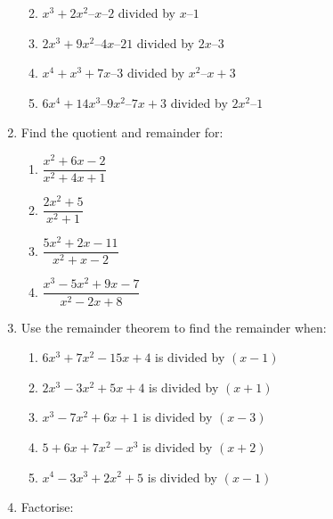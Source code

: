 \documentclass[
  12pt,
  oneside]{book}
\providecommand{\tightlist}{%
  \setlength{\itemsep}{0pt}\setlength{\parskip}{0pt}}
\theoremstyle{definition}
\theoremstyle{definition}
\theoremstyle{definition}
\theoremstyle{definition}
\theoremstyle{remark}
\begin{document}
\begin{enumerate}
  \begin{enumerate}
  \def\labelenumii{\alph{enumii})}
  \tightlist
  \item
    \(x^3 + 2x^2 – x – 2\) divided by \(x – 1\)
  \item
    \(2x^3 + 9x^2 – 4x – 21\) divided by \(2x – 3\)
  \item
    \(x^4 + x^3 + 7x – 3\) divided by \(x^2 – x + 3\)
  \item
    \(6x^4 + 14x^3 – 9x^2 – 7x + 3\) divided by \(2x^2 – 1\)
  \end{enumerate}
\item
  Find the quotient and remainder for:

  \begin{enumerate}
  \def\labelenumii{\alph{enumii})}
  \tightlist
  \item
    \(\dfrac{x^2+6x-2}{x^2+4x+1}\)
  \item
    \(\dfrac{2x^2+5}{x^2+1}\)
  \item
    \(\dfrac{5x^2+2x-11}{x^2+x-2}\)
  \item
    \(\dfrac{x^3-5x^2+9x-7}{x^2-2x+8}\)
  \end{enumerate}
\item
  Use the remainder theorem to find the remainder when:

  \begin{enumerate}
  \def\labelenumii{\alph{enumii})}
  \tightlist
  \item
    \(6x^3 + 7x^2 - 15x + 4\) is divided by \((x - 1)\)
  \item
    \(2x^3 - 3x^2 + 5x + 4\) is divided by \((x + 1)\)
  \item
    \(x^3 - 7x^2 + 6x + 1\) is divided by \((x - 3)\)
  \item
    \(5 + 6x + 7x^2 - x^3\) is divided by \((x + 2)\)
  \item
    \(x^4 - 3x^3 + 2x^2 + 5\) is divided by \((x - 1)\)
  \end{enumerate}
\item
  Factorise:


\end{enumerate}
\end{document}
